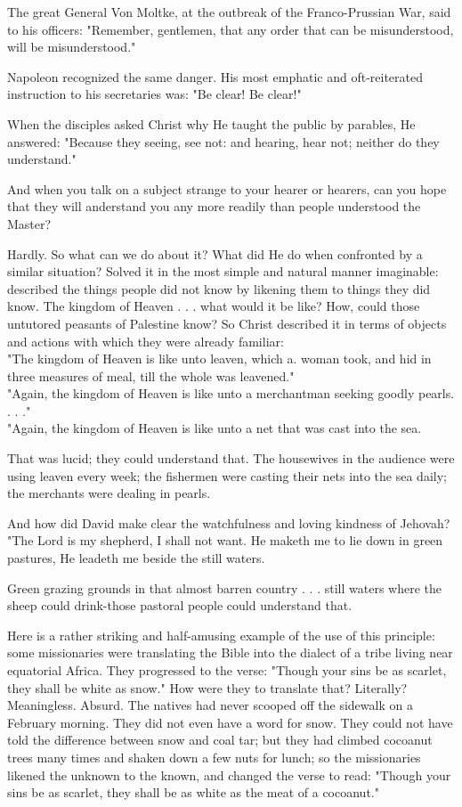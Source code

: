 \documentclass[10pt]{article}
\begin{document}
The great General Von Moltke, at the outbreak of the Franco-Prussian War, said to his officers: "Remember, gentlemen, that any order that can be misunderstood, will be misunderstood."

Napoleon recognized the same danger. His most emphatic and oft-reiterated instruction to his secretaries was: "Be clear! Be clear!"

When the disciples asked Christ why He taught the public by parables, He answered: "Because they seeing, see not: and hearing, hear not; neither do they understand."

And when you talk on a subject strange to your hearer or hearers, can you hope that they will anderstand you any more readily than people understood the Master?

Hardly. So what can we do about it? What did He do when confronted by a similar situation? Solved it in the most simple and natural manner imaginable: described the things people did not know by likening them to things they did know. The kingdom of Heaven . . . what would it be like? How, could those untutored peasants of Palestine know? So Christ described it in terms of objects and actions with which they were already familiar:\\
"The kingdom of Heaven is like unto leaven, which a. woman took, and hid in three measures of meal, till the whole was leavened."\\
"Again, the kingdom of Heaven is like unto a merchantman seeking goodly pearls. . . ."\\
"Again, the kingdom of Heaven is like unto a net that was cast into the sea.

That was lucid; they could understand that. The housewives in the audience were using leaven every week; the fishermen were casting their nets into the sea daily; the merchants were dealing in pearls.

And how did David make clear the watchfulness and loving kindness of Jehovah?\\
"The Lord is my shepherd, I shall not want. He maketh me to lie down in green pastures, He leadeth me beside the still waters.

Green grazing grounds in that almost barren country . . . still waters where the sheep could drink-those pastoral people could understand that.

Here is a rather striking and half-amusing example of the use of this principle: some missionaries were translating the Bible into the dialect of a tribe living near equatorial Africa. They progressed to the verse: "Though your sins be as scarlet, they shall be white as snow." How were they to translate that? Literally? Meaningless. Absurd. The natives had never scooped off the sidewalk on a February morning. They did not even have a word for snow. They could not have told the difference between snow and coal tar; but they had climbed cocoanut trees many times and shaken down a few nuts for lunch; so the missionaries likened the unknown to the known, and changed the verse to read: "Though your sins be as scarlet, they shall be as white as the meat of a cocoanut."
\end{document}
